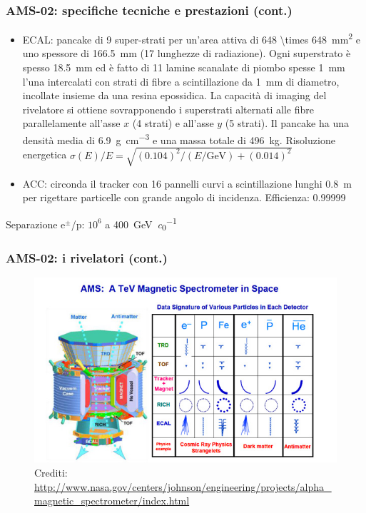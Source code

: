 \documentclass[10pt]{beamer}
\begin{document}
\begin{frame}
  \frametitle{AMS-02: specifiche tecniche e prestazioni (cont.)}
  \begin{itemize}
  \item ECAL: pancake di 9 super-strati per un'area attiva di
    \SI[parse-numbers=false]{648 \times 648}{\milli\metre\squared} e uno
    spessore di \SI{166.5}{\milli\metre} (17 lunghezze di radiazione).  Ogni
    superstrato è spesso \SI{18.5}{\milli\metre} ed è fatto di 11 lamine
    scanalate di piombo spesse \SI{1}{\milli\metre} l'una intercalati con strati
    di fibre a scintillazione da \SI{1}{\milli\metre} di diametro, incollate
    insieme da una resina epossidica.  La capacità di imaging del rivelatore si
    ottiene sovrapponendo i superstrati alternati alle fibre parallelamente
    all'asse $x$ (4 strati) e all'asse $y$ (5 strati).  Il pancake ha una
    densità media di \SI{6.9}{\gram\per\centi\metre\cubed} e una massa totale di
    \SI{496}{\kilogram}.  Risoluzione energetica
    $\sigma(E)/E = \sqrt{(0.104)^{2}/(E/\si{\giga\electronvolt}) + (0.014)^{2}}$
  \item ACC: circonda il tracker con 16 pannelli curvi a scintillazione
    lunghi \SI{0.8}{\metre} per rigettare particelle con grande angolo di
    incidenza.  Efficienza: \num{0.99999}
  \end{itemize}
  Separazione e$^{\pm}$/p: $10^{6}$ a \SI{400}{\giga\electronvolt\per\clight}
\end{frame}

\begin{frame}
  \frametitle{AMS-02: i rivelatori (cont.)}
  \begin{figure}
    \centering
    \includegraphics[width=0.9\columnwidth]{ams4}
    \caption{Crediti:
      \url{http://www.nasa.gov/centers/johnson/engineering/projects/alpha_magnetic_spectrometer/index.html}}
  \end{figure}
\end{frame}
\end{document}
